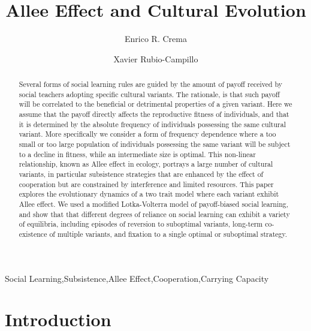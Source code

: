 \documentclass[preprint,authoryear]{elsarticle}
\begin{document}
\begin{frontmatter}

\title{Allee Effect and Cultural Evolution}

\author[label1,label2]{Enrico R. Crema}
\author[label3]{Xavier Rubio-Campillo}

\address[label1]{CaSEs - Complexity and Socio-Ecological Dynamics Research Group, Barcelona}
\address[label2]{UCL Institute of Archaeology}
\address[label3]{BSC - Barcelona Supercomputing Center}



\begin{abstract}
Several forms of social learning rules are guided by the amount of payoff received by social teachers adopting specific cultural variants. The rationale, is that such payoff will be correlated to the beneficial or detrimental properties of a given variant. Here we assume that the payoff directly affects the reproductive fitness of individuals, and that it is determined by the absolute frequency of individuals possessing the same cultural variant. More specifically we consider a  form of frequency dependence where a too small or too large population of individuals possessing the same variant will be subject to a decline in fitness, while an intermediate size is optimal. This non-linear relationship, known as Allee effect in ecology, portrays a large number of cultural variants, in particular subsistence strategies that are enhanced  by the effect of cooperation but are constrained by interference and limited resources. This paper explores the evolutionary dynamics of a two trait model where each variant exhibit Allee effect. We used a modified Lotka-Volterra model of payoff-biased social learning, and show that that different degrees of reliance on social learning can exhibit a variety of equilibria, including episodes of reversion to suboptimal variants, long-term co-existence of multiple variants, and fixation to a single optimal or suboptimal strategy.
\end{abstract}

\begin{keyword}
Social Learning\sep Subsistence\sep Allee Effect\sep Cooperation\sep Carrying Capacity
\end{keyword}

\end{frontmatter}

\section{Introduction}
\end{document}
